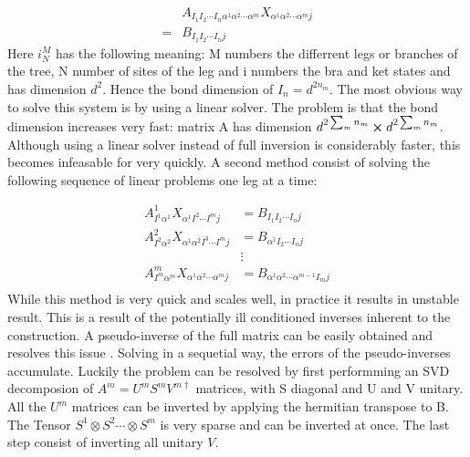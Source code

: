 \begin{equation}
    \begin{split}
        &A_{ I_1  I_2 \cdots I_n \alpha^1 \alpha^2 \cdots \alpha^m   } X_{ \alpha^1 \alpha^2 \cdots \alpha^m j  } \\
        = &B_{  I_1  I_2 \cdots I_n   j }
    \end{split}
\end{equation}
Here $i^M_N$ has the following meaning: M numbers the differrent legs or branches of the tree, N number of sites of the leg and i numbers the bra and ket states and has dimension $d^2$. Hence the bond dimension of $I_n= d^{2 n_m }$. The most obvious way to solve this system is by using a linear solver. The problem is that the bond dimension increases very fast: matrix A has dimension $d^ {2 \sum_m n_m } \cross d^ {2 \sum_m n_m } $. Although using a linear solver instead of full inversion is considerably faster, this becomes infeasable for very quickly. A second method consist of solving the following sequence of linear problems one leg at a time:

\begin{equation}
    \begin{split}
        A^1_{ I^1 \alpha^1 } X_{ \alpha^1  I^2 \cdots I^m j} &=  B_{  I_1  I_2 \cdots I_n   j }\\
        A^2_{ I^2 \alpha^2 } X_{ \alpha^1   \alpha^2  I^3 \cdots I^m j} &=  B_{  \alpha^1  I_2 \cdots I_n   j }\\
        &\vdots\\
        A^m_{ I^m \alpha^m } X_{ \alpha^1 \alpha^2 \cdots \alpha^m j  } &=  B_{ \alpha^1 \alpha^2 \cdots \alpha^{m-1} I_m   j }\\
    \end{split}
\end{equation}
While this method is very quick and scales well, in practice it results in unstable result. This is a result of the potentially ill conditioned inverses inherent to the construction. A pseudo-inverse of the full matrix can be easily obtained and resolves this issue . Solving in a sequetial way, the errors of the pseudo-inverses accumulate. Luckily the problem can be resolved by first performming an SVD decomposion of $A^m = U^m S^m  V^{m\dagger}$ matrices, with S diagonal and U and V unitary. All the $U^m$ matrices can be inverted by applying the hermitian transpose to B. The Tensor $S^1 \otimes S^2 \cdots \otimes S^m$ is very sparse and can be inverted at once. The last step consist of inverting all unitary $V$.

